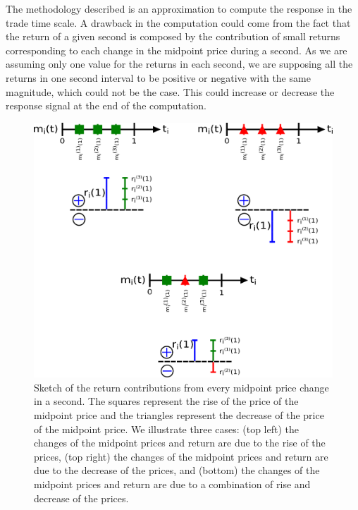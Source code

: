 The methodology described is an approximation to compute the response in the
trade time scale. A drawback in the computation could come from the fact that
the return of a given second is composed by the contribution of small returns
corresponding to each change in the midpoint price during a second. As we are
assuming only one value for the returns in each second, we are supposing  all
the returns in one second interval to be positive or negative with the same
magnitude, which could not be the case. This could increase or decrease the
response signal at the end of the computation.

\begin{figure}[htbp]
    \centering
    \includegraphics[width=\columnwidth]{figures/02_return_contributions.png}
    \caption{Sketch of the return contributions from every midpoint price
             change in a second. The squares represent the rise of the price of
             the midpoint price and the triangles represent the decrease of the
             price of the midpoint price. We illustrate three cases: (top left)
             the changes of the midpoint prices and return are due to the rise
             of the prices, (top right) the changes of the midpoint prices and
             return are due to the decrease of the prices, and (bottom) the
             changes of the midpoint prices and return are due to a combination
             of rise and decrease of the prices.}
    \label{fig:return_contributions}
\end{figure}

